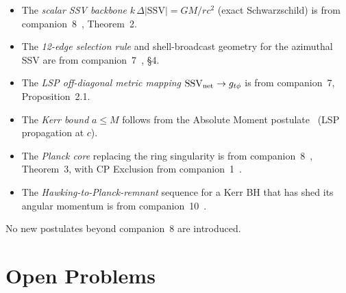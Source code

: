 \documentclass[12pt]{article}
\newcommand{\SSV}{\mathrm{SSV}}
\begin{document}
\begin{itemize}[noitemsep]
  \item The \emph{scalar SSV backbone} $k\,\Delta|\SSV| = GM/rc^2$
    (exact Schwarzschild) is from companion~8~\cite{c8}, Theorem~2.
  \item The \emph{12-edge selection rule} and shell-broadcast geometry
    for the azimuthal SSV are from companion~7~\cite{c7}, §4.
  \item The \emph{LSP off-diagonal metric mapping} $\SSV_{\rm net}
    \to g_{t\phi}$ is from companion~7, Proposition~2.1.
  \item The \emph{Kerr bound} $a \leq M$ follows from the Absolute
    Moment postulate~\cite{c1} (LSP propagation at $c$).
  \item The \emph{Planck core} replacing the ring singularity is from
    companion~8~\cite{c8}, Theorem~3, with CP Exclusion from
    companion~1~\cite{c1}.
  \item The \emph{Hawking-to-Planck-remnant} sequence for a Kerr BH
    that has shed its angular momentum is from companion~10~\cite{c10}.
\end{itemize}

No new postulates beyond companion~8 are introduced.

\section{Open Problems}
\label{sec:open}
\end{document}
